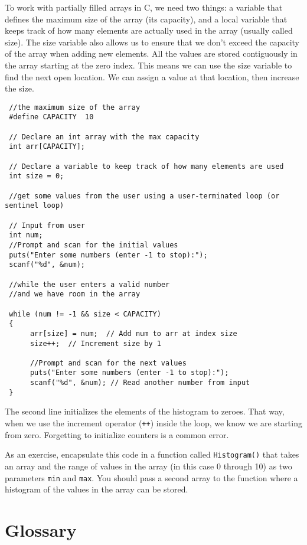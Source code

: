 To work with partially filled arrays in C, we need two things: a variable that defines the maximum size of the array (its capacity), and a local variable that keeps track of how many elements are actually used in the array (usually called size). The size variable also allows us to ensure that we don't exceed the capacity of the array when adding new elements. All the values are stored contiguously in the array starting at the zero index. This means we can use the size variable to find the next open location. We can assign a value at that location, then increase the size.

\begin{verbatim}
 //the maximum size of the array
 #define CAPACITY  10
 
 // Declare an int array with the max capacity 
 int arr[CAPACITY];

 // Declare a variable to keep track of how many elements are used
 int size = 0;

 //get some values from the user using a user-terminated loop (or sentinel loop)

 // Input from user
 int num;
 //Prompt and scan for the initial values
 puts("Enter some numbers (enter -1 to stop):");
 scanf("%d", &num);

 //while the user enters a valid number 
 //and we have room in the array

 while (num != -1 && size < CAPACITY) 
 {
	  arr[size] = num; 	// Add num to arr at index size
	  size++;  // Increment size by 1
	
	  //Prompt and scan for the next values
	  puts("Enter some numbers (enter -1 to stop):");
	  scanf("%d", &num); // Read another number from input
 }

\end{verbatim}
%
The second line initializes the elements of the histogram to
zeroes.  That way, when we use the increment
operator ({\tt ++}) inside the loop, we know we are starting from zero.
Forgetting to initialize counters is a common error.

As an exercise, encapsulate this code in a function called {\tt Histogram()} 
that takes an array and the range of values in the array
(in this case 0 through 10) as two parameters \texttt{min} and \texttt{max}. 
You should pass a second array to the function where a histogram of the
values in the array can be stored.

\section{Glossary}

